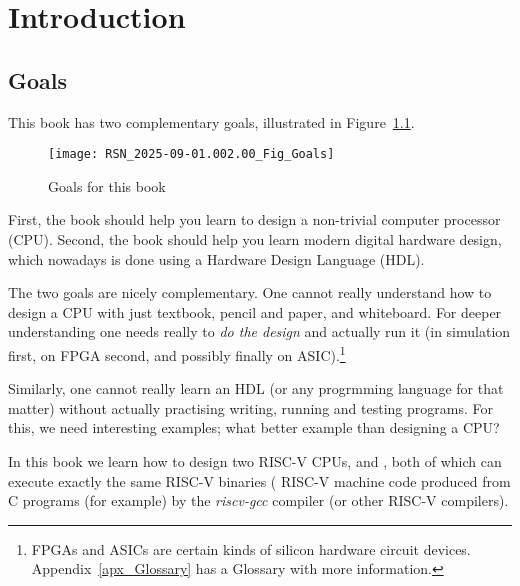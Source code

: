 

\chapter{Introduction}



\setcounter{page}{1}
\renewcommand{\thepage}{\arabic{chapter}-\arabic{page}}

\label{ch_intro}


\section{Goals}

\label{Sec_Goals}

This book has two complementary goals, illustrated in Figure~\ref{Fig_Goals}.
\begin{figure}[htbp]
  \centerline{\texttt{[image: RSN\_2025-09-01.002.00\_Fig\_Goals]}}
  \caption{\label{Fig_Goals}Goals for this book}
\end{figure}

First, the book should help you learn to design a non-trivial computer
processor (CPU).  Second, the book should help you learn modern
digital hardware design, which nowadays is done using a Hardware
Design Language (HDL).

The two goals are nicely complementary.  One cannot really understand
how to design a CPU with just textbook, pencil and paper, and
whiteboard.  For deeper understanding one needs really to \emph{do the
design} and actually run it (in simulation first, on FPGA second, and
possibly finally on ASIC).\footnote{FPGAs and ASICs are certain kinds
of silicon hardware circuit devices.  Appendix~\ref{apx_Glossary} has
a Glossary with more information.}

Similarly, one cannot really learn an HDL (or any progrmming language
for that matter) without actually practising writing, running and
testing programs.  For this, we need interesting examples; what better
example than designing a CPU?

In this book we learn how to design two RISC-V CPUs, {\DRUM} and
{\FIFE}, both of which can execute exactly the same RISC-V
binaries ({\ie} RISC-V machine code produced from C programs (for
example) by the \emph{riscv-gcc} compiler (or other RISC-V compilers).

